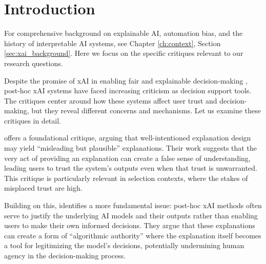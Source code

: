 
\section{Introduction}
For comprehensive background on explainable AI, automation bias, and the history of interpretable AI systems, see Chapter \ref{ch:context}, Section \ref{sec:xai_background}. Here we focus on the specific critiques relevant to our research questions.

Despite the promise of xAI in enabling fair and explainable decision-making \cite{Goodman_Flaxman_2017}, post-hoc xAI systems have faced increasing criticism as decision support tools. The critiques center around how these systems affect user trust and decision-making, but they reveal different concerns and mechanisms. Let us examine these critiques in detail.

\textcite{Lipton} offers a foundational critique, arguing that well-intentioned explanation design may yield ``misleading but plausible'' explanations. Their work suggests that the very act of providing an explanation can create a false sense of understanding, leading users to trust the system's outputs even when that trust is unwarranted. This critique is particularly relevant in selection contexts, where the stakes of misplaced trust are high.

Building on this, \textcite{miller_explainable_2023} identifies a more fundamental issue: post-hoc xAI methods often serve to justify the underlying AI models and their outputs rather than enabling users to make their own informed decisions. They argue that these explanations can create a form of ``algorithmic authority'' where the explanation itself becomes a tool for legitimizing the model's decisions, potentially undermining human agency in the decision-making process.

